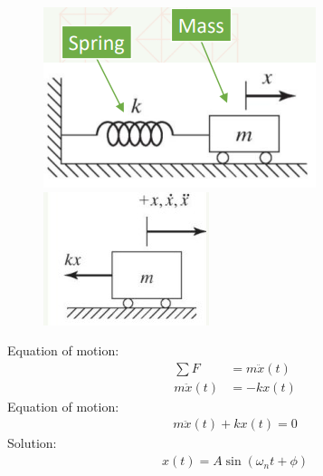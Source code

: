 \begin{figure}[H]
    \centering
    \begin{minipage}{.5\textwidth}
        \centering
        \includegraphics[width=.8\linewidth]{./img/diagram1.jpg}
    \end{minipage}%
    \begin{minipage}{.5\textwidth}
        \centering
        \includegraphics[width=.8\linewidth]{./img/diagram2.jpg}
    \end{minipage}
\end{figure}
Equation of motion:
\begin{align}
    \sum F       & = m\ddot{x} (t) \\
    m\ddot{x}(t) & = -kx(t)
\end{align}
Equation of motion:
\begin{gather}
    m\ddot{x}(t) + kx(t) = 0
\end{gather}
Solution:
\begin{gather}
    x(t) = A\sin \left(\omega_n t + \phi \right)
\end{gather}
